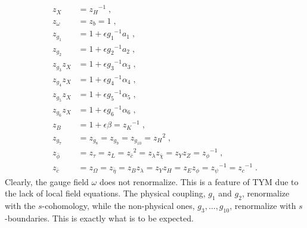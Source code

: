 \documentclass[../main.tex]{subfiles}
\begin{document}
\begin{subequations}%
  \label{eq:z-factors}
  \begin{align}
    z_{ X }               & = { z_{ H } }^{ -1 } \;,                                                                                                                          \\
    z_{ \omega }          & = z_{ b } = 1 \;,                                                                                                                                 \\
    z_{ g_{ 1 } }         & = 1 + \epsilon { g_{ 1 } }^{ -1 } a_{ 1 } \;,                                                                                                     \\
    z_{ g_{ 2 } }         & = 1 + \epsilon { g_{ 2 } }^{ -1 } a_{ 2 } \;,                                                                                                     \\
    z_{ g_{ 3 } } z_{ X } & = 1 + \epsilon { g_{ 3 } }^{ -1 } \alpha_{ 3 } \;,                                                                                                \\
    z_{ g_{ 4 } } z_{ X } & = 1 + \epsilon { g_{ 4 } }^{ -1 } \alpha_{ 4 } \;,                                                                                                \\
    z_{ g_{ 5 } } z_{ X } & = 1 + \epsilon { g_{ 5 } }^{ -1 } \alpha_{ 5 } \;,                                                                                                \\
    z_{ g_{ 6 } } z_{ X } & = 1 + \epsilon { g_{ 6 } }^{ -1 } \alpha_{ 6 } \;,                                                                                                \\
    z_{ B }               & = 1 + \epsilon \beta = { z_{ K } }^{ -1 } \;,                                                                                                     \\
    z_{ g_{ 7 } }         & = z_{ g_{ 8 } } =  z_{ g_{ 9 } } = z_{ g_{ 10 } }  = { z_{ H } }^{ 2 } \;,                                                                        \\
    z_{ \bar{ \phi } }    & = z_{ \tau } = z_{ L } = {z_{ \bar{ c } }}^{ 2 } = z_{ \lambda } z_{ \bar{ \chi } } = z_{ Y } z_{ Z } = {z_{ \phi } }^{ -1 } \;,                  \\
    z_{ \bar{ c } }       & = z_{ \Omega } = z_{ \bar{ \eta } } = z_{ B } z_{ \lambda } = z_{ Y } z_{ H } = z_{ E } z_{ \phi } = {z_{ \psi } }^{ -1 } = {z_{ c } }^{ -1 } \;.
  \end{align}
\end{subequations}
Clearly, the gauge field $ \omega $ does not renormalize. This is a feature of TYM due to the lack of local field equations. The physical coupling, $ g_1 $ and $ g_2 $, renormalize with the $ s $-cohomology, while the non-physical ones, $ g_3, \ldots, g_{10} $, renormalize with $ s $-boundaries. This is exactly what is to be expected.
\end{document}
